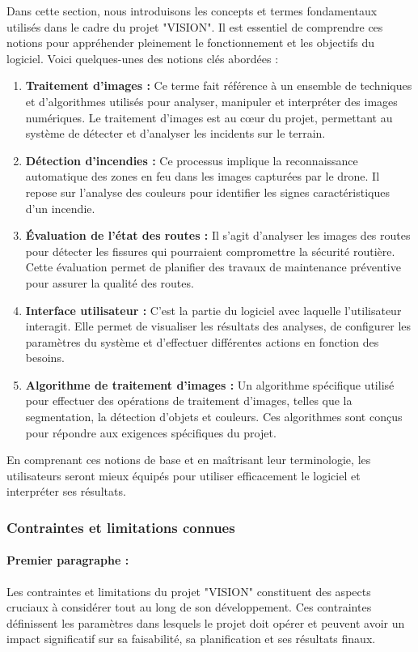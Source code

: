 Dans cette section, nous introduisons les concepts et termes fondamentaux utilisés dans le cadre du projet "VISION". Il est essentiel de comprendre ces notions pour appréhender pleinement le fonctionnement et les objectifs du logiciel. Voici quelques-unes des notions clés abordées :
\begin{enumerate}
    \item \textbf{Traitement d'images :} Ce terme fait référence à un ensemble de techniques et d'algorithmes utilisés pour analyser, manipuler et interpréter des images numériques. Le traitement d'images est au cœur du projet, permettant au système de détecter et d'analyser les incidents sur le terrain.


\item \textbf{Détection d'incendies : }Ce processus implique la reconnaissance automatique des zones en feu dans les images capturées par le drone. Il repose sur l'analyse des couleurs pour identifier les signes caractéristiques d'un incendie.


\item \textbf{Évaluation de l'état des routes :} Il s'agit d'analyser les images des routes pour détecter les fissures qui pourraient compromettre la sécurité routière. Cette évaluation permet de planifier des travaux de maintenance préventive pour assurer la qualité des routes.

\item \textbf{Interface utilisateur : }C'est la partie du logiciel avec laquelle l'utilisateur interagit. Elle permet de visualiser les résultats des analyses, de configurer les paramètres du système et d'effectuer différentes actions en fonction des besoins.

\item \textbf{Algorithme de traitement d'images :} Un algorithme spécifique utilisé pour effectuer des opérations de traitement d'images, telles que la segmentation, la détection d'objets et couleurs. Ces algorithmes sont conçus pour répondre aux exigences spécifiques du projet.
\end{enumerate} 
En comprenant ces notions de base et en maîtrisant leur terminologie, les utilisateurs seront mieux équipés pour utiliser efficacement le logiciel et interpréter ses résultats.
\subsubsection{Contraintes et limitations connues}

\paragraph{Premier paragraphe :}Les contraintes et limitations du projet "VISION" constituent des aspects cruciaux à considérer tout au long de son développement. Ces contraintes définissent les paramètres dans lesquels le projet doit opérer et peuvent avoir un impact significatif sur sa faisabilité, sa planification et ses résultats finaux. 

